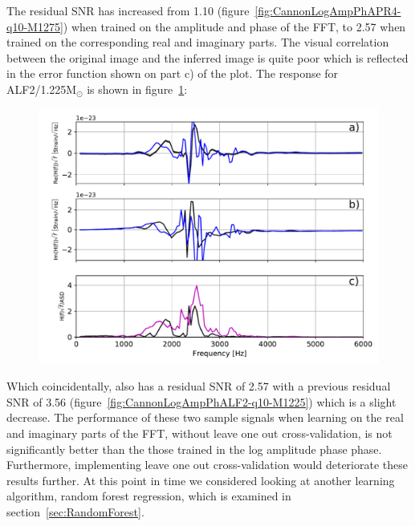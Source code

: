 The residual SNR has increased from 1.10 (figure~\ref{fig:CannonLogAmpPhAPR4-q10-M1275}) when trained on the amplitude and phase of the FFT, to 2.57 when trained on the corresponding real and imaginary parts. The visual correlation between the original image and the inferred image is quite poor which is reflected in the error function shown on part c) of the plot. The response for ALF2/1.225M$_\odot$ is shown in figure~\ref{fig:CannonReImALF2-q10-M1225}:
\begin{figure}[H]
	\includegraphics[width=15cm]{./img/CannonReImALF2-q10-M1225.pdf} 
	\caption[\protect]{\protect}
	\label{fig:CannonReImALF2-q10-M1225}
\end{figure}
Which coincidentally, also has a residual SNR of 2.57 with a previous residual SNR of 3.56 (figure~\ref{fig:CannonLogAmpPhALF2-q10-M1225}) which is a slight decrease. The performance of these two sample signals when learning on the real and imaginary parts of the FFT, without leave one out cross-validation, is  not significantly better than the those trained in the log amplitude phase phase. Furthermore, implementing leave one out cross-validation would deteriorate these results further. At this point in time we considered looking at another learning algorithm, random forest regression, which is examined in section~\ref{sec:RandomForest}.\\
